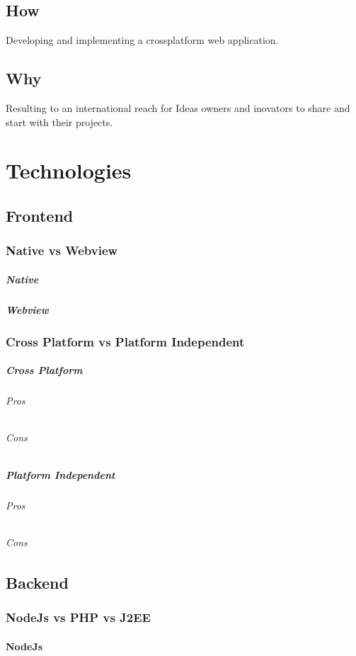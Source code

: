 \documentclass[11pt, openany]{report}
\begin{document}
\section{How}
Developing and implementing a crossplatform web application.
\section{Why} 
Resulting to an international reach for Ideas owners and inovators to share and start with their projects.

\chapter{ Technologies }
\section{Frontend}
\subsection{ Native vs Webview}
\paragraph{Native}
\paragraph{Webview}
\subsection{ Cross Platform vs Platform Independent }
\paragraph{Cross Platform}
\subparagraph{Pros}
\subparagraph{Cons}
\paragraph{Platform Independent}
\subparagraph{Pros}
\subparagraph{Cons}

\section{ Backend }
\subsection{ NodeJs vs PHP vs J2EE }
\subsubsection{NodeJs}
\end{document}
